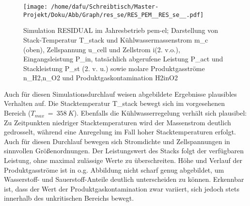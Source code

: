 \documentclass[onecolumn,10pt,titlepage]{article}
\begin{document}
\begin{figure}[H]
	\centering
	\texttt{[image: /home/dafu/Schreibtisch/Master-Projekt/Doku/Abb/Graph/res\_se/RES\_PEM\_\_RES\_se\_\_.pdf]}

	\caption[Simulation RESIDUAL im Jahresbetrieb \gls{pem}-\gls{el}]{Simulation RESIDUAL im Jahresbetrieb \gls{pem}-\gls{el}; Darstellung von Stack-Temperatur \gls{T_stack} und Kühlwassermassenstrom \gls{m_c} (oben), Zellspannung \gls{u_cell} und Zellstrom \gls{i}(2. v.o.), Eingangsleistung \gls{P_in},  tatsächlich abgerufene Leistung \gls{P_act} und Stackleistung \gls{P_st} (2. v. u.) sowie molare Produktgasströme \gls{n_H2},\gls{n_O2} und Produktgaskontamination \gls{H2inO2}}
	\label{fig:plt_se_RES_PEM}
\end{figure}
Auch für diesen Simulationsdurchlauf weisen abgebildete Ergebnisse plausibles Verhalten auf. Die Stacktemperatur \gls{T_stack} bewegt sich im vorgesehenen Bereich ($T_{max}~=~358~K$). Ebenfalls die Kühlwasserregelung verhält sich plausibel: Zu Zeitpunkten niedriger Stacktemperaturen wird der Massenstrom deutlich gedrosselt, während eine Anregelung im Fall hoher Stacktemperaturen erfolgt. Auch für diesen Durchlauf bewegen sich Stromdichte und Zellspannungen in sinnvollen Größenordnungen. Der Leistungswert des Stacks folgt der verfügbaren Leistung, ohne maximal zulässige Werte zu überschreiten.
Höhe und Verlauf der Produktgasströme ist in o.g. Abbildung nicht scharf genug abgebildet, um Wasserstoff- und Sauerstoff-Anteile deutlich unterscheiden zu können. Erkennbar ist, dass der Wert der Produktgaskontamination zwar variiert, sich jedoch stets innerhalb des unkritischen Bereichs bewegt.
\end{document}
